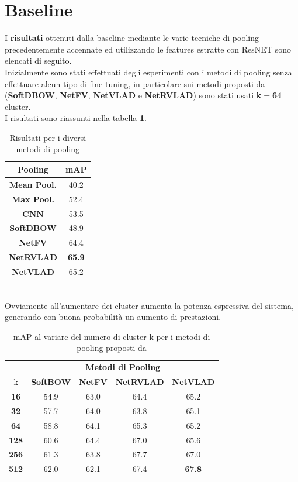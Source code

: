 \section{Baseline}
I \textbf{risultati} ottenuti dalla baseline mediante le varie tecniche di pooling precedentemente accennate ed utilizzando le features estratte con ResNET sono elencati di seguito.\cite{soccerNet} 
\\Inizialmente sono stati effettuati degli esperimenti con i metodi di pooling senza effettuare alcun tipo di fine-tuning, in particolare sui metodi proposti da \citet{MiechPooling} (\textbf{SoftDBOW}, \textbf{NetFV}, \textbf{NetVLAD} e \textbf{NetRVLAD}) sono stati usati \textbf{k$=$64} cluster.
\\I risultati sono riassunti nella tabella \textbf{\ref{table: baselinek16}}.
\begin{table}[ht]
\caption{Risultati per i diversi metodi di pooling}
\centering
\begin{tabular}{c| | c}
\textbf{Pooling} & \textbf{mAP} \\
\hline
\textbf{Mean Pool.} & 40.2 \\
\textbf{Max Pool.} &  52.4\\
\textbf{CNN} & 53.5\\
\textbf{SoftDBOW} & 48.9\\
\textbf{NetFV} & 64.4\\
\textbf{NetRVLAD} & \textbf{65.9}\\
\textbf{NetVLAD} & 65.2\\ [1ex]

\end{tabular}
\label{table: baselinek16}
\end{table}
\\Ovviamente all'aumentare dei cluster aumenta la potenza espressiva del sistema, generando con buona probabilità un aumento di prestazioni.
\begin{table}[ht]

\caption{mAP al variare del numero di cluster k per i metodi di pooling proposti da \citet{MiechPooling}}
\label{table: baselinek16to512}
\centering
\begin{tabular}{c| | c|c|c |  c}
&\multicolumn{4}{c}{\textbf{Metodi di Pooling}} \\
k & \textbf{SoftBOW} & \textbf{NetFV} & \textbf{NetRVLAD} & \textbf{NetVLAD} \\
\hline
\textbf{16}& 54.9 & 63.0 & 64.4 & 65.2 \\
\textbf{32} & 57.7 & 64.0 & 63.8 & 65.1 \\
\textbf{64}& 58.8 &  64.1 & 65.3 & 65.2 \\
\textbf{128}& 60.6 & 64.4 & 67.0 & 65.6 \\
\textbf{256}& 61.3 & 63.8 & 67.7 & 67.0 \\
\textbf{512} & 62.0 & 62.1 & 67.4 & \textbf{67.8} \\[1ex]

\end{tabular}
\end{table}
